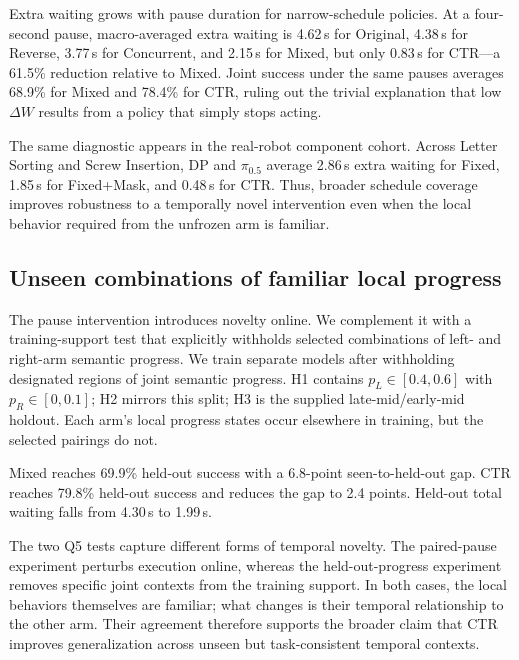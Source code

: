 \documentclass{article}
\newcommand{\method}{CTR}
\begin{document}
Extra waiting grows with pause duration for narrow-schedule policies. At a four-second pause, macro-averaged extra waiting is 4.62\,s for Original, 4.38\,s for Reverse, 3.77\,s for Concurrent, and 2.15\,s for Mixed, but only 0.83\,s for \method{}---a 61.5\% reduction relative to Mixed. Joint success under the same pauses averages 68.9\% for Mixed and 78.4\% for \method{}, ruling out the trivial explanation that low $\Delta W$ results from a policy that simply stops acting.

The same diagnostic appears in the real-robot component cohort. Across Letter Sorting and Screw Insertion, DP and $\pi_{0.5}$ average 2.86\,s extra waiting for Fixed, 1.85\,s for Fixed+Mask, and 0.48\,s for \method{}. Thus, broader schedule coverage improves robustness to a temporally novel intervention even when the local behavior required from the unfrozen arm is familiar.

\subsection{Unseen combinations of familiar local progress}
The pause intervention introduces novelty online. We complement it with a training-support test that explicitly withholds selected combinations of left- and right-arm semantic progress. We train separate models after withholding designated regions of joint semantic progress. H1 contains $p_L\in[0.4,0.6]$ with $p_R\in[0,0.1]$; H2 mirrors this split; H3 is the supplied late-mid/early-mid holdout. Each arm's local progress states occur elsewhere in training, but the selected pairings do not.

\begin{table}[t]
\caption{Performance on seen and held-out joint-progress combinations, macro-averaged over three models and three holdout splits. Gap is seen SR minus held-out SR in percentage points; waiting is summed over arms (s).}
\label{tab:heldout}
\centering\small\setlength{\tabcolsep}{4pt}

\end{table}

Mixed reaches 69.9\% held-out success with a 6.8-point seen-to-held-out gap. \method{} reaches 79.8\% held-out success and reduces the gap to 2.4 points. Held-out total waiting falls from 4.30\,s to 1.99\,s.

The two Q5 tests capture different forms of temporal novelty. The paired-pause experiment perturbs execution online, whereas the held-out-progress experiment removes specific joint contexts from the training support. In both cases, the local behaviors themselves are familiar; what changes is their temporal relationship to the other arm. Their agreement therefore supports the broader claim that \method{} improves generalization across unseen but task-consistent temporal contexts.
\end{document}

